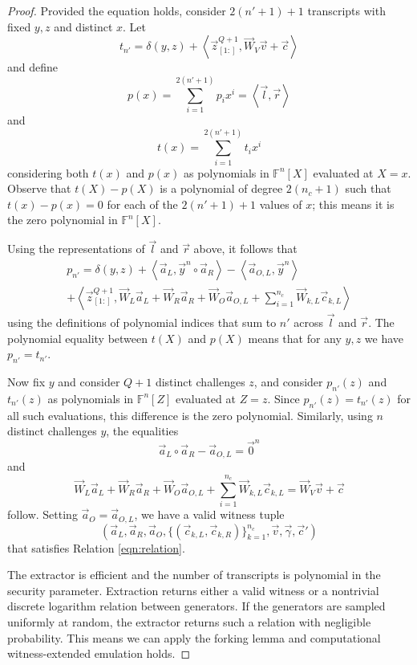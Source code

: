 \documentclass{article}
\newcommand{\FF}{\mathbb{F}}
\newcommand{\mat}[1]{\vec{#1}}
\newcommand{\zq}{\vec{z}^{Q+1}_{[1:]}}
\begin{document}
\begin{proof}
	Provided the equation holds, consider $2(n' + 1) + 1$ transcripts with fixed $y, z$ and distinct $x$.
	Let
	$$t_{n'} = \delta(y, z) + \left\langle \zq, \mat{W}_V \vec{v} + \vec{c} \right\rangle$$
	and define
	$$p(x) = \sum_{i=1}^{2(n' + 1)} p_i x^i = \left\langle \vec{l}, \vec{r} \right\rangle$$
	and
	$$t(x) = \sum_{i=1}^{2(n' + 1)} t_i x^i$$
	considering both $t(x)$ and $p(x)$ as polynomials in $\FF^n[X]$ evaluated at $X = x$.
	Observe that $t(X) - p(X)$ is a polynomial of degree $2(n_c + 1)$ such that $t(x) - p(x) = 0$ for each of the $2(n' + 1) + 1$ values of $x$; this means it is the zero polynomial in $\FF^n[X]$.

	Using the representations of $\vec{l}$ and $\vec{r}$ above, it follows that
	\begin{multline*}
		p_{n'} = \delta(y, z) + \left\langle \vec{a}_L, \vec{y}^n \circ \vec{a}_R \right\rangle - \left\langle \vec{a}_{O,L}, \vec{y}^n \right\rangle \\
		+ \left\langle \zq, \mat{W}_L \vec{a}_L + \mat{W}_R \vec{a}_R + \mat{W}_O \vec{a}_{O,L} + \sum_{i=1}^{n_c} \mat{W}_{k,L} \vec{c}_{k,L} \right\rangle
	\end{multline*}
	using the definitions of polynomial indices that sum to $n'$ across $\vec{l}$ and $\vec{r}$.
	The polynomial equality between $t(X)$ and $p(X)$ means that for any $y, z$ we have $p_{n'} = t_{n'}$.

	Now fix $y$ and consider $Q + 1$ distinct challenges $z$, and consider $p_{n'}(z)$ and $t_{n'}(z)$ as polynomials in $\FF^n[Z]$ evaluated at $Z = z$.
	Since $p_{n'}(z) = t_{n'}(z)$ for all such evaluations, this difference is the zero polynomial.
	Similarly, using $n$ distinct challenges $y$, the equalities
	$$\vec{a}_L \circ \vec{a}_R - \vec{a}_{O,L} = \vec{0}^n$$
	and
	$$\mat{W}_L \vec{a}_L + \mat{W}_R \vec{a}_R + \mat{W}_O \vec{a}_{O,L} + \sum_{i=1}^{n_c} \mat{W}_{k,L} \vec{c}_{k,L} = \mat{W}_V \vec{v} + \vec{c}$$
	follow.
	Setting $\vec{a}_O = \vec{a}_{O,L}$, we have a valid witness tuple
	$$\left( \vec{a}_L, \vec{a}_R, \vec{a}_O, \{ (\vec{c}_{k,L}, \vec{c}_{k,R}) \}_{k=1}^{n_c}, \vec{v}, \vec{\gamma}, \vec{c}' \right)$$
	that satisfies Relation \ref{eqn:relation}.

	The extractor is efficient and the number of transcripts is polynomial in the security parameter.
	Extraction returns either a valid witness or a nontrivial discrete logarithm relation between generators.
	If the generators are sampled uniformly at random, the extractor returns such a relation with negligible probability.
	This means we can apply the forking lemma and computational witness-extended emulation holds.
\end{proof}
\end{document}

